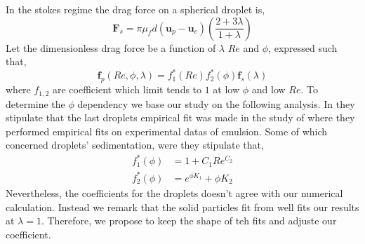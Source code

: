 In the stokes regime the drag force on a spherical droplet is, 
\begin{equation*}
    \textbf{F}_s
    =\pi \mu_f d (\textbf{u}_p - \textbf{u}_c) \left(\frac{2+3\lambda}{1+\lambda}\right)
\end{equation*}
Let the dimensionless drag force be a function of $\lambda$ $Re$ and $\phi$, expressed such that, 
\begin{equation}
    \textbf{f}_p(Re,\phi,\lambda)
    = 
    f_1^*(Re)
    f_2^*(\phi)
    \textbf{f}_s(\lambda)
\end{equation}
where $f_{1,2}$ are coefficient which limit tends to $1$ at low $\phi$ and low $Re$. 
To determine the $\phi$ dependency we base our study on the following analysis. 
In \cite[chapter 4]{ashgriz2011handbook} they stipulate that the last droplets empirical fit was made in the study of \citet{rusche2000effect} where they performed empirical fits on experimental datas of emulsion. 
Some of which concerned droplets' sedimentation, were they stipulate that, 
\begin{align*}
    f_1^*(\phi) 
    &=1  + C_1 Re^{C_2}\\
    f_2^*(\phi) 
    &= e^{\phi K_1} + \phi K_2
    \label{eq:drag_fit}
\end{align*}
Nevertheless, the coefficients for the droplets doesn't agree with our numerical calculation. 
Instead we remark that the solid particles fit from \citet{rusche2000effect} well fits our results at $\lambda = 1$. 
Therefore, we propose to keep the shape of teh fits and adjuste our coefficient. 

